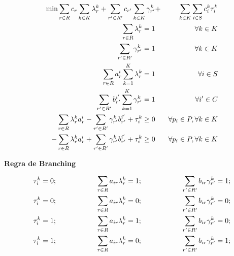 \documentclass[12pt]{article}
\begin{document}
\begin{footnotesize}
\begin{eqnarray}
\label{C01}
\textrm{min} \sum\limits_{r \in R} {c_r \sum\limits_{k \in K}{\lambda^k_r}} + \sum\limits_{r' \in R'} {c_{r'} \sum\limits_{k \in K}{\gamma^k_{r'}}} & + & \sum\limits_{k \in K} {\sum\limits_{i \in S} {c^k_i \tau^k_i}} \\
\label{C02}
  \sum\limits_{r \in R} {\lambda^k_r} = 1 &\hspace{3mm}& \forall k \in K \\
\label{C03}
  \sum\limits_{r' \in R'} {\gamma^k_{r'}} = 1 &\hspace{3mm}& \forall k \in K \\
\label{C04}
  \sum\limits_{r \in R} {a^i_r \sum\limits_{k = 1}^K{\lambda^k_r}} = 1 &\hspace{3mm}& \forall i \in S \\
\label{C05}
  \sum\limits_{r' \in R'} {b^{i'}_{r'} \sum\limits_{k =1}^K{\gamma^k_{r'}}} = 1 &\hspace{3mm}& \forall i' \in C \\
\label{C06}
 \sum\limits_{r \in R}{\lambda^k_r a^i_r} - \sum\limits_{r' \in R'}{\gamma^k_{r'} b^{i'}_{r'}} + \tau^k_i \ge 0 &\hspace{3mm}& \forall p_i \in P, \forall k \in K \\
\label{C07}
 -\sum\limits_{r \in R}{\lambda^k_r a^i_r} + \sum\limits_{r' \in R'}{\gamma^k_{r'} b^{i'}_{r'}} + \tau^k_i \ge 0 &\hspace{3mm}& \forall p_i \in P, \forall k \in K
\end{eqnarray}
\vspace{-5mm}
\begin{center} \textbf{Regra de Branching} \end{center}
\vspace{-5mm}
\begin{eqnarray}
\label{b1}
\tau^k_i = 0; \hspace{20mm}  \sum\limits_{r \in R} {a_{ir} \lambda^k_r} = 1;  \hspace{20mm}  \sum\limits_{r' \in R'} {b_{ir} \gamma^k_{r'}} = 1;  \\
\label{b2}
\tau^k_i = 0; \hspace{20mm}  \sum\limits_{r \in R} {a_{ir} \lambda^k_r} = 0;  \hspace{20mm}  \sum\limits_{r' \in R'} {b_{ir} \gamma^k_{r'}} = 0;  \\
\label{b3}
\tau^k_i = 1; \hspace{20mm}  \sum\limits_{r \in R} {a_{ir} \lambda^k_r} = 1;  \hspace{20mm}  \sum\limits_{r' \in R'} {b_{ir} \gamma^k_{r'}} = 0;  \\ 
\label{b4}
\tau^k_i = 1; \hspace{20mm}  \sum\limits_{r \in R} {a_{ir} \lambda^k_r} = 0;  \hspace{20mm}  \sum\limits_{r' \in R'} {b_{ir} \gamma^k_{r'}} = 1;
\end{eqnarray}
\end{footnotesize}
\end{document}
